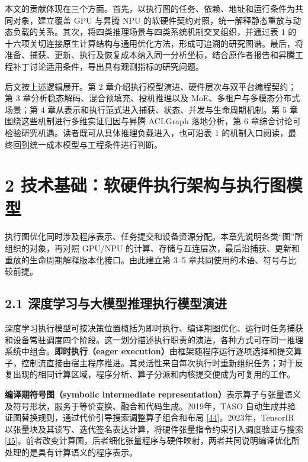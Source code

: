 \documentclass[UTF8,10.5pt,fontset=windows]{ctexart}
\begin{document}
本文的贡献体现在三个方面。首先，以执行图的任务、依赖、地址和运行条件为共同对象，建立覆盖
GPU 与昇腾 NPU
的软硬件契约对照，统一解释静态重放与动态负载的关系。其次，将四类推理场景与四类系统机制交叉组织，并通过表
1
的十六项关切连接原生计算结构与通用优化方法，形成可追溯的研究图谱。最后，将准备、捕获、更新、执行及恢复成本纳入同一分析坐标，结合原作者报告和昇腾工程补丁讨论适用条件，导出具有观测指标的研究问题。

后文按上述逻辑展开。第 2
章介绍执行模型演进、硬件层次与双平台编程契约；第 3
章分析稳态解码、混合预填充、投机推理以及
MoE、多租户与多模态分布式场景；第 4
章从表示和执行范式进入捕获、状态、并发与生命周期机制。第 5
章围绕这些机制进行多维实证归因与昇腾 ACLGraph 落地分析，第 6
章综合讨论可检验研究机遇。读者既可从具体推理负载进入，也可沿表 1
的机制入口阅读，最终回到统一成本模型与工程条件进行判断。

\hypertarget{section-2}{%
\section{2 技术基础：软硬件执行架构与执行图模型}\label{section-2}}

执行图优化同时涉及程序表示、任务提交和设备资源分配。本章先说明各类``图''所组织的对象，再对照
GPU/NPU
的计算、存储与互连层次，最后沿捕获、更新和重放的生命周期解释版本化接口。由此建立第
3--5 章共同使用的术语、符号与比较前提。

\hypertarget{section-2-1}{%
\subsection{2.1 深度学习与大模型推理执行模型演进}\label{section-2-1}}

深度学习执行模型可按决策位置概括为即时执行、编译期图优化、运行时任务捕获和设备常驻调度四个阶段。这一划分描述执行职责的演进，各种方式可在同一推理系统中组合。\textbf{即时执行（eager
execution）}由框架随程序运行逐项选择和提交算子，控制流直接由宿主程序推进。其灵活性来自每次执行时重新组织任务；对于反复出现的相同计算区域，程序分析、算子分派和内核提交便成为可复用的工作。

\textbf{编译期符号图（symbolic intermediate
representation）}表示算子与张量语义及符号形状，服务于等价变换、融合和代码生成。2019年，TASO
自动生成并验证图替换规则，通过代价引导搜索调整算子组合和布局
{[}\protect\hyperlink{ref-jia2019taso}{44}{]}。2023年，TensorIR
以张量块及其读写、迭代签名表达计算，将硬件张量指令约束引入调度验证与搜索
{[}\protect\hyperlink{ref-feng2023tensorir}{45}{]}。前者改变计算图，后者细化张量程序与硬件映射，两者共同说明编译优化所处理的是具有计算语义的程序表示。
\end{document}
